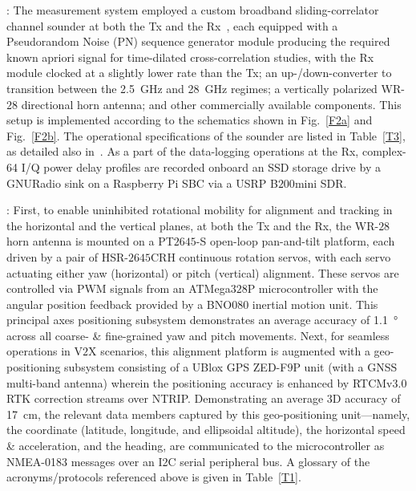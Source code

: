 \documentclass[12pt, draftcls, onecolumn]{IEEEtran}
\begin{document}
: The measurement system employed a custom broadband sliding-correlator channel sounder at both the Tx and the Rx~\cite{Purdue}, each equipped with a Pseudorandom Noise (PN) sequence generator module producing the required known apriori signal for time-dilated cross-correlation studies, with the Rx module clocked at a slightly lower rate than the Tx; an up-/down-converter to transition between the \SI{2.5}{\giga\hertz} and \SI{28}{\giga\hertz} regimes; a vertically polarized WR-$28$ directional horn antenna; and other commercially available components. This setup is implemented according to the schematics shown in Fig.~\ref{F2a} and Fig.~\ref{F2b}. The operational specifications of the sounder are listed in Table~\ref{T3}, as detailed also in~\cite{Purdue}. As a part of the data-logging operations at the Rx, complex-\SI{64}{} I/Q power delay profiles are recorded onboard an SSD storage drive by a GNURadio sink on a Raspberry Pi SBC via a USRP B$200$mini SDR.

: First, to enable uninhibited rotational mobility for alignment and tracking in the horizontal and the vertical planes, at both the Tx and the Rx, the WR-$28$ horn antenna is mounted on a PT$2645$-S open-loop pan-and-tilt platform, each driven by a pair of HSR-$2645$CRH continuous rotation servos, with each servo actuating either yaw (horizontal) or pitch (vertical) alignment. These servos are controlled via PWM signals from an ATMega$328$P microcontroller with the angular position feedback provided by a BNO$080$ inertial motion unit. This principal axes positioning subsystem demonstrates an average accuracy of \SI{1.1}{\degree} across all coarse- \& fine-grained yaw and pitch movements. Next, for seamless operations in V$2$X scenarios, this alignment platform is augmented with a geo-positioning subsystem consisting of a UBlox GPS ZED-F$9$P unit (with a GNSS multi-band antenna) wherein the positioning accuracy is enhanced by RTCMv$3.0$ RTK correction streams over NTRIP. Demonstrating an average $3$D accuracy of \SI{17}{\centi\meter}, the relevant data members captured by this geo-positioning unit---namely, the coordinate (latitude, longitude, and ellipsoidal altitude), the horizontal speed \& acceleration, and the heading, are communicated to the microcontroller as NMEA-0183 messages over an I2C serial peripheral bus. A glossary of the acronyms/protocols referenced above is given in Table~\ref{T1}.
\end{document}

